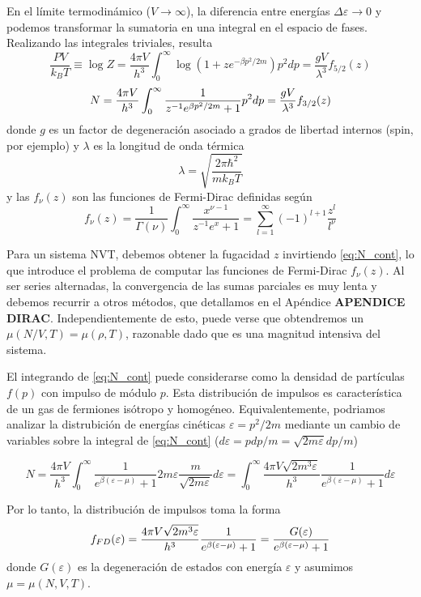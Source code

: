 En el límite termodinámico ($V\to\infty$), la diferencia entre energías $\Delta\varepsilon\to 0$ y podemos transformar la sumatoria en una integral en el espacio de fases.
Realizando las integrales triviales, resulta
\begin{equation}
 \frac{PV}{k_BT} \equiv \log Z = \frac{4\pi V}{h^3} \int_0^\infty \log(1+ze^{-\beta p^2/2m})p^2dp = \frac{gV}{\lambda^3}f_{5/2}(z)
\end{equation}
\begin{equation}{\label{eq:N_cont}}
 N = \frac{4\pi V}{h^3} \int_0^\infty \frac{1}{z^{-1}e^{\beta p^2/2m}+1} p^2dp = \frac{gV}{\lambda^3}f_{3/2}(z)
\end{equation}
donde $g$ es un factor de degeneración asociado a grados de libertad internos (spin, por ejemplo) y  $\lambda$ es la longitud de onda térmica
\[ \lambda = \sqrt{ \frac{2\pi\hbar^2}{mk_BT} } \]
y las $f_\nu(z)$ son las funciones de Fermi-Dirac definidas según
\[ f_\nu(z) = \frac{1}{\Gamma(\nu)}\int_0^\infty \frac{x^{\nu-1}}{z^{-1}e^x+1} = \sum_{l=1}^\infty (-1)^{l+1}\frac{z^l}{l^\nu}\]

Para un sistema NVT, debemos obtener la fugacidad $z$ invirtiendo \eqref{eq:N_cont}, lo que introduce el problema de computar las funciones de Fermi-Dirac $f_\nu(z)$.
Al ser series alternadas, la convergencia de las sumas parciales es muy lenta y debemos recurrir a otros métodos, que detallamos en el Apéndice \textbf{APENDICE DIRAC}.
Independientemente de esto, puede verse que obtendremos un $\mu(N/V,T) = \mu(\rho, T)$, razonable dado que es una magnitud intensiva del sistema.

El integrando de \eqref{eq:N_cont} puede considerarse como la densidad de partículas $f(p)$ con impulso de módulo $p$.
Esta distribución de impulsos es característica de un gas de fermiones isótropo y homogéneo.
Equivalentemente, podriamos analizar la distrubición de energías cinéticas $\varepsilon=p^2/2m$ mediante un cambio de variables sobre la integral de \eqref{eq:N_cont}
($d\varepsilon = pdp/m = \sqrt{2m\varepsilon}dp/m$)

\[ N = \frac{4\pi V}{h^3} \int_0^\infty \frac{1}{e^{\beta(\varepsilon-\mu)}+1} 2m\varepsilon\frac{m}{\sqrt{2m\varepsilon}}d\varepsilon =
\int_0^\infty \frac{4\pi V\sqrt{2m^3\varepsilon}}{h^3}\frac{1}{e^{\beta(\varepsilon-\mu)}+1} d\varepsilon\]

Por lo tanto, la distribución de impulsos toma la forma
\begin{equation}{\label{eq:dist_FD}}
 f_{FD}(\varepsilon) = \frac{4\pi V \sqrt{2m^3\varepsilon}}{h^3}\frac{1}{e^{\beta(\varepsilon-\mu)}+1} = \frac{G(\varepsilon)}{e^{\beta(\varepsilon-\mu)}+1}
\end{equation}
donde $G(\varepsilon)$ es la degeneración de estados con energía $\varepsilon$ y asumimos $\mu=\mu(N,V,T)$.

